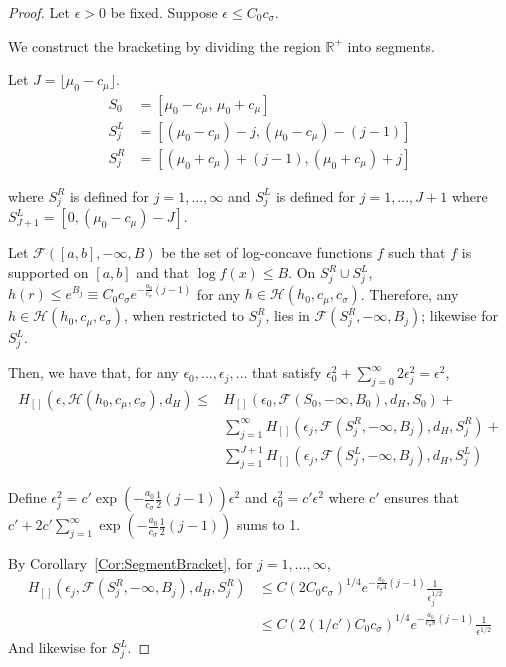 \documentclass[12pt]{article}
\begin{document}
\begin{proof}
Let $\epsilon > 0$ be fixed. Suppose $\epsilon \leq C_0 c_\sigma$.
  
  We construct the bracketing by dividing the region $\mathbb{R}^+$ into segments.

  Let $J = \lfloor \mu_0 - c_\mu \rfloor$.
  \begin{align*}
    S_0 &= [\mu_0 - c_\mu,\, \mu_0 + c_\mu] \\
    S^L_j &= [(\mu_0 - c_\mu) - j, (\mu_0 - c_\mu) - (j - 1)] \\
    S^R_j &= [(\mu_0 + c_\mu) + (j-1), (\mu_0 + c_\mu) + j] 
  \end{align*}

  where $S^R_j$ is defined for $j=1,...,\infty$ and $S^L_j$ is defined for $j=1,...,J+1$ where $S^L_{J+1} = [0, (\mu_0 - c_\mu) - J]$.

  Let $\mathcal{F}([a,b], -\infty, B)$ be the set of log-concave functions $f$ such that $f$ is supported on $[a,b]$ and that $ \log f(x) \leq B$. On $S^R_j \cup S^L_j$, $h(r) \leq e^{B_j} \equiv C_0 c_\sigma e^{- \frac{a_0}{c_\sigma} (j-1)}$ for any $h \in \mathcal{H}(h_0, c_\mu, c_{\sigma})$. Therefore, any $h \in \mathcal{H}(h_0, c_\mu, c_\sigma)$, when restricted to $S^R_j$, lies in $\mathcal{F}(S^R_j, -\infty, B_j)$; likewise for $S^L_j$. 

  Then, we have that, for any $\epsilon_0, ..., \epsilon_j, ...$ that satisfy $\epsilon_0^2 + \sum_{j=0}^\infty 2 \epsilon_j^2 = \epsilon^2$,
  \begin{align*}
    H_{[]}(\epsilon, \mathcal{H}(h_0, c_\mu, c_\sigma), d_H) \leq &
    H_{[]}(\epsilon_0, \mathcal{F}(S_0, -\infty, B_0), d_H, S_0) + \\ 
    & \sum_{j=1}^\infty H_{[]}(\epsilon_j, \mathcal{F}(S^R_j, -\infty, B_j), d_H, S^R_j) + \\
    & \sum_{j=1}^{J+1} H_{[]}(\epsilon_j, \mathcal{F}(S^L_j, -\infty, B_j), d_H, S^L_j)
  \end{align*}

  Define $\epsilon_j^2 = c' \exp\left( - \frac{a_0}{c_\sigma} \frac{1}{2} (j-1) \right) \epsilon^2$ and $\epsilon_0^2 = c' \epsilon^2$ where $c'$ ensures that $c' + 2c' \sum_{j=1}^\infty \exp\left( - \frac{a_0}{c_\sigma} \frac{1}{2} (j-1) \right)$ sums to 1.  
  
  By Corollary~\ref{Cor:SegmentBracket}, for $j=1,...,\infty$,
  \begin{align*}
    H_{[]}(\epsilon_j, \mathcal{F}(S^R_j, -\infty, B_j), d_H, S^R_j) &\leq
                                                                       C (2 C_0 c_\sigma)^{1/4} e^{ - \frac{a_0}{c_\sigma 4} (j-1)} \frac{1}{\epsilon_j^{1/2}} \\
     &\leq  C (2 (1/c') C_0 c_\sigma)^{1/4} e^{ - \frac{a_0}{c_\sigma 8} (j-1)} \frac{1}{\epsilon^{1/2}}
  \end{align*}
  And likewise for $S^L_j$.


\end{proof}
\end{document}
